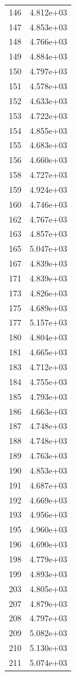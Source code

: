 \documentclass[12pt]{article}
\begin{document}
\begin{longtable}{@{}cc@{}}
146 & 4.812e+03 \\
147 & 4.853e+03 \\
148 & 4.766e+03 \\
149 & 4.884e+03 \\
150 & 4.797e+03 \\
151 & 4.578e+03 \\
152 & 4.633e+03 \\
153 & 4.722e+03 \\
154 & 4.855e+03 \\
155 & 4.683e+03 \\
156 & 4.660e+03 \\
158 & 4.727e+03 \\
159 & 4.924e+03 \\
160 & 4.746e+03 \\
162 & 4.767e+03 \\
163 & 4.857e+03 \\
165 & 5.047e+03 \\
167 & 4.839e+03 \\
171 & 4.839e+03 \\
173 & 4.826e+03 \\
175 & 4.689e+03 \\
177 & 5.157e+03 \\
180 & 4.804e+03 \\
181 & 4.665e+03 \\
183 & 4.712e+03 \\
184 & 4.755e+03 \\
185 & 4.793e+03 \\
186 & 4.663e+03 \\
187 & 4.748e+03 \\
188 & 4.748e+03 \\
189 & 4.763e+03 \\
190 & 4.853e+03 \\
191 & 4.687e+03 \\
192 & 4.669e+03 \\
193 & 4.956e+03 \\
195 & 4.960e+03 \\
196 & 4.690e+03 \\
198 & 4.779e+03 \\
199 & 4.893e+03 \\
203 & 4.805e+03 \\
207 & 4.879e+03 \\
208 & 4.797e+03 \\
209 & 5.082e+03 \\
210 & 5.130e+03 \\
211 & 5.074e+03 \\

\end{longtable}
\end{document}

